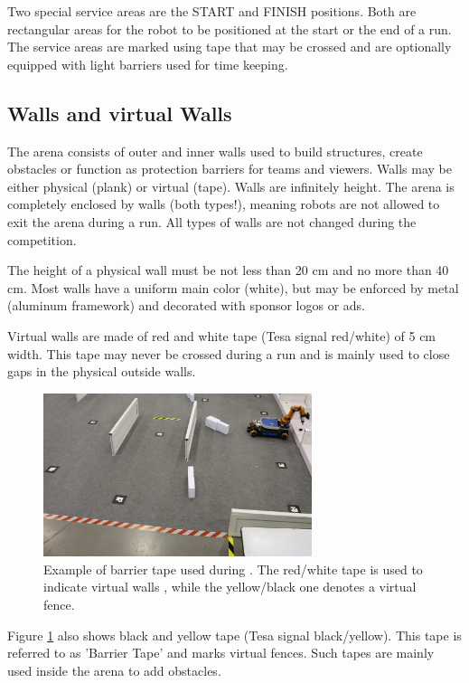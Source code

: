 Two special service areas are the START and FINISH positions. Both are rectangular areas for the robot to be positioned at the start or the end of a run. The service areas are marked using tape that may be crossed and are optionally equipped with light barriers used for time keeping.


\subsection{Walls and virtual Walls}
\label{subsec: Walls and virtual Walls}

The arena consists of outer and inner walls used to build structures, create obstacles or function as protection barriers for teams and viewers. Walls may be either physical (plank) or virtual (tape). Walls are infinitely height.
The arena is completely enclosed by walls (both types!), meaning robots are not allowed to exit the arena during a run. All types of walls are not changed during the competition.

The height of a physical wall must be not less than 20 cm and no more than 40 cm.
Most walls have a uniform main color (white), but may be enforced by metal (aluminum framework) and decorated with sponsor logos or ads.

Virtual walls are made of red and white tape (Tesa signal red/white) of 5 cm width. This tape may never be crossed during a run and is mainly used to close gaps in the physical outside walls.

\begin{figure} [h!]
\centering
\includegraphics[width= 0.7\textwidth ]{./images/general_rules/barrier_tapes_in_china15.jpg}
\caption{Example of barrier tape used during . The red/white tape is used to indicate virtual walls , while the yellow/black one denotes a virtual fence.}
\label{fig:walls_and_virt_walls}
\end{figure}

Figure \ref{fig:walls_and_virt_walls} also shows black and yellow tape (Tesa signal black/yellow). 
This tape is referred to as 'Barrier Tape' and marks virtual fences. 
Such tapes are mainly used inside the arena to add obstacles.

